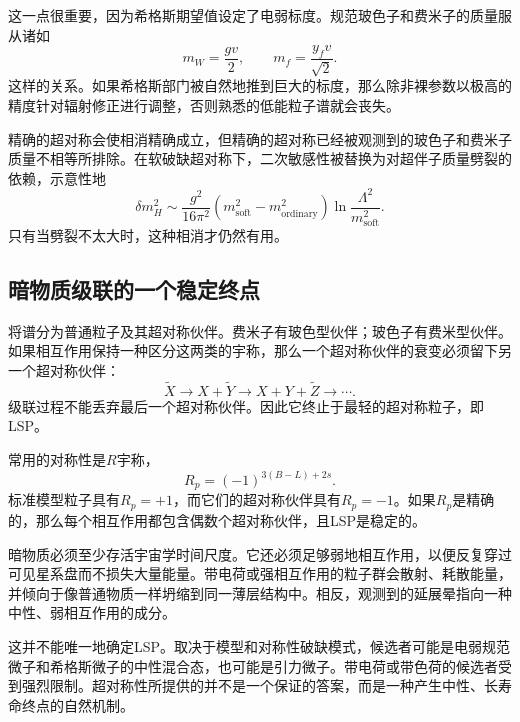 这一点很重要，因为希格斯期望值设定了电弱标度。规范玻色子和费米子的质量服从诸如
\begin{equation}
m_W=\frac{gv}{2},
\qquad
m_f=\frac{y_fv}{\sqrt2}.
\end{equation}
这样的关系。如果希格斯部门被自然地推到巨大的标度，那么除非裸参数以极高的精度针对辐射修正进行调整，否则熟悉的低能粒子谱就会丧失。

精确的超对称会使相消精确成立，但精确的超对称已经被观测到的玻色子和费米子质量不相等所排除。在软破缺超对称下，二次敏感性被替换为对超伴子质量劈裂的依赖，示意性地
\begin{equation}
\delta m_H^2
\sim
\frac{g^2}{16\pi^2}
\left(m_{\mathrm{soft}}^2-m_{\mathrm{ordinary}}^2\right)
\ln\frac{\Lambda^2}{m_{\mathrm{soft}}^2}.
\end{equation}
只有当劈裂不太大时，这种相消才仍然有用。

\subsection{暗物质级联的一个稳定终点}

将谱分为普通粒子及其超对称伙伴。费米子有玻色型伙伴；玻色子有费米型伙伴。如果相互作用保持一种区分这两类的宇称，那么一个超对称伙伴的衰变必须留下另一个超对称伙伴：
\begin{equation}
\widetilde X
\longrightarrow X+\widetilde Y
\longrightarrow X+Y+\widetilde Z
\longrightarrow\cdots.
\end{equation}
级联过程不能丢弃最后一个超对称伙伴。因此它终止于最轻的超对称粒子，即LSP。

常用的对称性是\(R\)宇称，
\begin{equation}
R_p=(-1)^{3(B-L)+2s}.
\end{equation}
标准模型粒子具有\(R_p=+1\)，而它们的超对称伙伴具有\(R_p=-1\)。如果\(R_p\)是精确的，那么每个相互作用都包含偶数个超对称伙伴，且LSP是稳定的。

暗物质必须至少存活宇宙学时间尺度。它还必须足够弱地相互作用，以便反复穿过可见星系盘而不损失大量能量。带电荷或强相互作用的粒子群会散射、耗散能量，并倾向于像普通物质一样坍缩到同一薄层结构中。相反，观测到的延展晕指向一种中性、弱相互作用的成分。

这并不能唯一地确定LSP。取决于模型和对称性破缺模式，候选者可能是电弱规范微子和希格斯微子的中性混合态，也可能是引力微子。带电荷或带色荷的候选者受到强烈限制。超对称性所提供的并不是一个保证的答案，而是一种产生中性、长寿命终点的自然机制。

